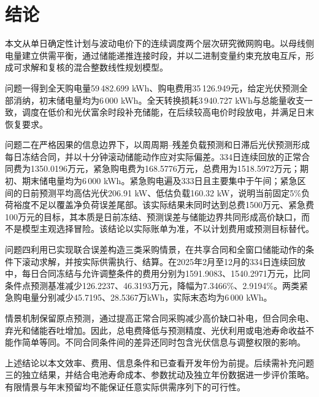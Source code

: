 \section{结论}
本文从单日确定性计划与波动电价下的连续调度两个层次研究微网购电。以母线侧电量建立供需平衡，通过储能递推连接时段，并以二进制变量约束充放电互斥，形成可求解和复核的混合整数线性规划模型。

问题一得到全天购电量59\,482.699 kWh、购电费用35\,126.949元，给定光伏预测全部消纳，初末储电量均为6\,000 kWh。全天转换损耗3\,940.727 kWh与总能量收支一致，调度在低价和光伏富余时段补充储能，在后续较高电价时段放电，并满足日末恢复要求。

问题二在严格因果的信息边界下，以周周期--残差负载预测和日滞后光伏预测形成每日冻结合同，并以十分钟滚动储能动作应对实际偏差。334日连续回放的正常合同费为1350.0196万元，紧急购电费为168.5776万元，总费用为1518.5972万元；期初、期末储电量均为6\,000 kWh。紧急购电遍及333日且主要集中于午间；紧急区间的日前预测平均高估光伏206.91 kW、低估负载160.32 kW，说明当前固定5\%负荷裕度不足以覆盖净负荷误差尾部。该实际结果未同时达到总费1500万元、紧急费100万元的目标，其本质是日前冻结、预测误差与储能边界共同形成高价缺口，而不是模型主观选择冒险。该结论以实际账单为准，不以计划费用或预测目标替代。

问题四利用已实现联合误差构造三类采购情景，在共享合同和全窗口储能动作的条件下滚动求解，并按实际供需执行、结算。在2025年2月至12月的334日连续回放中，每日合同冻结与允许调整条件的费用分别为1591.9083、1540.2971万元，比同条件点预测基准减少126.2237、46.3193万元，降幅为7.3466\%、2.9194\%。两类紧急购电量分别减少45.7195、28.5367万kWh，实际末态均为6\,000 kWh。

情景机制保留原点预测，通过提高正常合同采购减少高价缺口补电，但合同余电、弃光和储能吞吐增加。因此，总电费降低与预测精度、光伏利用或电池寿命收益不能作简单等同。不同合同条件间的差异还同时包含光伏信息与调整权限的影响。

上述结论以本文效率、费用、信息条件和已查看开发年份为前提。后续需补充问题三的独立结果，并结合电池寿命成本、参数扰动及独立年份数据进一步评价策略。有限情景与年末预留均不能保证任意实际供需序列下的可行性。
